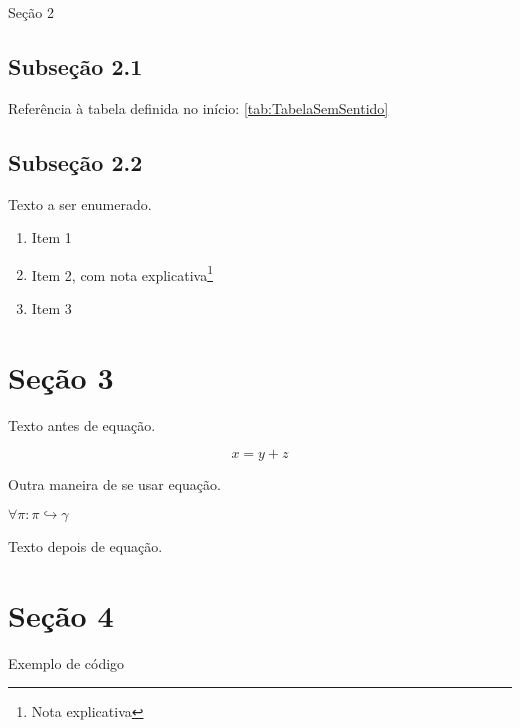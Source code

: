 Seção 2


\subsection{Subseção 2.1}

Referência à tabela definida no início: \ref{tab:TabelaSemSentido}


\subsection{Subseção 2.2}

Texto a ser enumerado.

\begin{enumerate}
   \item Item 1
   \item Item 2, com nota explicativa\footnote{Nota explicativa}
   \item Item 3
\end{enumerate}


\section{Seção 3}

Texto antes de equação.

\begin{equation}
   x = y + z
\end{equation}

Outra maneira de se usar equação.

$ \forall \pi : \pi \hookrightarrow \gamma $

Texto depois de equação.

\section{Seção 4}

Exemplo de código
